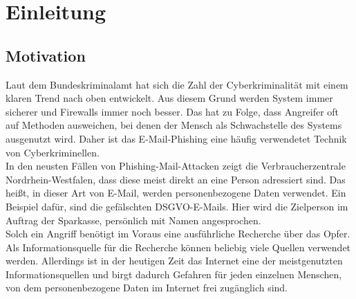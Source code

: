 \chapter{Einleitung}
\label{cha:einleitung}


\section{Motivation}
\label {sec:Motivation}
Laut dem Bundeskriminalamt hat sich die Zahl der Cyberkriminalität mit einem klaren Trend nach oben entwickelt. \cite{Cyberkriminalitaet} Aus diesem Grund werden System immer sicherer und Firewalls immer noch besser. Das hat zu Folge, dass Angreifer oft auf Methoden ausweichen, bei denen der Mensch als Schwachstelle des Systems ausgenutzt wird. Daher ist das E-Mail-Phishing eine häufig verwendetet Technik von Cyberkriminellen.\\
In den neusten Fällen von Phishing-Mail-Attacken zeigt die Verbraucherzentrale Nordrhein-Westfalen, dass diese meist direkt an eine Person adressiert sind. Das heißt, in dieser Art von E-Mail, werden personenbezogene Daten verwendet. Ein Beispiel dafür, sind die gefälschten DSGVO-E-Mails. Hier wird die Zielperson im Auftrag der Sparkasse, persönlich mit Namen angesprochen. \cite{VerbraucherzentraleNW} \\
Solch ein Angriff benötigt im Voraus eine ausführliche Recherche über das Opfer. Als Informationsquelle für die Recherche können beliebig viele Quellen verwendet werden. Allerdings ist in der heutigen Zeit das Internet eine der meistgenutzten Informationsquellen und birgt dadurch Gefahren für jeden einzelnen Menschen, von dem personenbezogene Daten im Internet frei zugänglich sind.\cite{Inforamtionsquellen}\\

